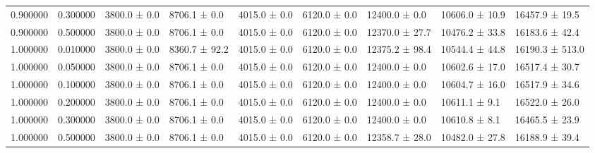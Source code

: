 \begin{table}
\begin{tabular}{rrlllllll}
0.900000 & 0.300000 & 3800.0 ± 0.0 & 8706.1 ± 0.0 & 4015.0 ± 0.0 & 6120.0 ± 0.0 & 12400.0 ± 0.0 & 10606.0 ± 10.9 & 16457.9 ± 19.5 \\
0.900000 & 0.500000 & 3800.0 ± 0.0 & 8706.1 ± 0.0 & 4015.0 ± 0.0 & 6120.0 ± 0.0 & 12370.0 ± 27.7 & 10476.2 ± 33.8 & 16183.6 ± 42.4 \\
1.000000 & 0.010000 & 3800.0 ± 0.0 & 8360.7 ± 92.2 & 4015.0 ± 0.0 & 6120.0 ± 0.0 & 12375.2 ± 98.4 & 10544.4 ± 44.8 & 16190.3 ± 513.0 \\
1.000000 & 0.050000 & 3800.0 ± 0.0 & 8706.1 ± 0.0 & 4015.0 ± 0.0 & 6120.0 ± 0.0 & 12400.0 ± 0.0 & 10602.6 ± 17.0 & 16517.4 ± 30.7 \\
1.000000 & 0.100000 & 3800.0 ± 0.0 & 8706.1 ± 0.0 & 4015.0 ± 0.0 & 6120.0 ± 0.0 & 12400.0 ± 0.0 & 10604.7 ± 16.0 & 16517.9 ± 34.6 \\
1.000000 & 0.200000 & 3800.0 ± 0.0 & 8706.1 ± 0.0 & 4015.0 ± 0.0 & 6120.0 ± 0.0 & 12400.0 ± 0.0 & 10611.1 ± 9.1 & 16522.0 ± 26.0 \\
1.000000 & 0.300000 & 3800.0 ± 0.0 & 8706.1 ± 0.0 & 4015.0 ± 0.0 & 6120.0 ± 0.0 & 12400.0 ± 0.0 & 10610.8 ± 8.1 & 16465.5 ± 23.9 \\
1.000000 & 0.500000 & 3800.0 ± 0.0 & 8706.1 ± 0.0 & 4015.0 ± 0.0 & 6120.0 ± 0.0 & 12358.7 ± 28.0 & 10482.0 ± 27.8 & 16188.9 ± 39.4 \\
\bottomrule
\end{tabular}
\end{table}
